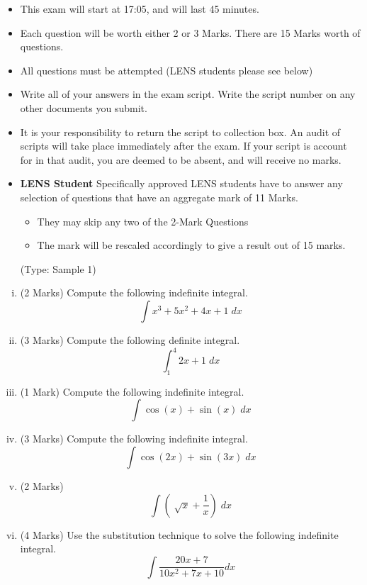 \documentclass[11pt]{article} %
\begin{document}
	\begin{itemize} 
		\item This exam will start at 17:05, and will last 45 minutes.
		
		\item Each question will be worth either 2 or 3 Marks. There are 15 Marks worth of questions.
		\item All questions must be attempted (LENS students please see below)
		
		\item Write all of your answers in the exam script. Write the script number on any other documents you submit.
		
		\item It is your responsibility to return the script to collection box. An audit of scripts will take place immediately after the exam. If your script is account for in that audit,  you are deemed to be absent, and will receive no marks.
		
		\item \textbf{LENS Student}
		Specifically approved LENS students have to answer any selection of questions that have an aggregate mark of 11 Marks.  
		\begin{itemize}
			\item They may skip any two of the 2-Mark Questions
			\item The mark will be rescaled accordingly to give a result out of 15 marks.
		\end{itemize}
		(Type: Sample 1)		
		
	\end{itemize}
\newpage
\begin{enumerate}[(i)]
	\item (2 Marks) Compute the following indefinite integral.
		\[ \int x^3 + 5x^2+ 4x + 1 \; dx \]
	\item (3 Marks) Compute the following definite integral.
	\[ \int^{4}_{1} 2x + 1 \; dx \]
	
\newpage	
	\item (1 Mark) Compute the following indefinite integral.
		\[ \int \cos(x)  + \sin(x) \; dx \]
	\item (3 Marks) Compute the following indefinite integral.
			\[ \int \cos(2x)  + \sin(3x) \; dx \]

\newpage
	\item (2 Marks)
{\Large	\[  \int \left( \;\sqrt{x} + \frac{1}{x} \right) \; dx\]
}
\newpage	


	\item (4 Marks) Use the substitution technique to solve the following indefinite integral.
		\[  \int  \frac{20x+7}{10x^2+7x +10}  dx\]
\end{enumerate}

\end{document}
